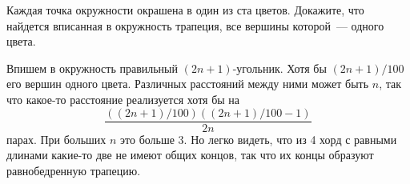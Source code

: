 Каждая точка окружности окрашена в один из ста цветов.
Докажите, что найдется вписанная в окружность трапеция, все вершины которой~---
одного цвета.

\solution
Впишем в окружность правильный $(2 n + 1)$-угольник.
Хотя бы $(2 n + 1) / 100$ его вершин одного цвета.
Различных расстояний между ними может быть $n$, так что какое-то расстояние
реализуется хотя бы на
\[
    \dfrac{((2 n + 1) / 100)((2 n + 1) / 100 - 1)}{2 n}
\]
парах.
При больших $n$ это больше 3.
Но легко видеть, что из 4 хорд с равными длинами какие-то две не имеют общих
концов, так что их концы образуют равнобедренную трапецию.

